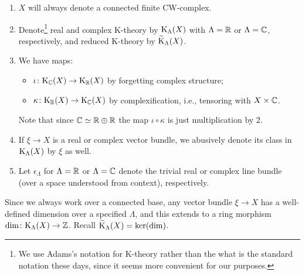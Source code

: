 \begin{notation}
  \begin{enumerate}[leftmargin=*]
  \item $X$ will always denote a connected finite CW-complex.
  \item Denote\footnote{We use Adams's notation for K-theory rather
      than the what is the standard notation these days, since it
      seems more convenient for our purposes.} real and complex
    K-theory by $\mathrm{K}_\Lambda(X)$ with $\Lambda = \mathbb{R}$ or $\Lambda = \mathbb{C}$,
    respectively, and reduced K-theory by $\widetilde{\mathrm{K}}_\Lambda(X)$.
  \item We have maps:
    \begin{itemize}
    \item $\iota \colon \mathrm{K}_{\mathbb{C}}(X) \to \mathrm{K}_{\mathbb{R}}(X)$ by forgetting complex
      structure;
    \item $\kappa \colon \mathrm{K}_{\mathbb{R}}(X) \to \mathrm{K}_{\mathbb{C}}(X)$ by complexification, i.e.,
      tensoring with $X \times \mathbb{C}$.
    \end{itemize}
    Note that since $\mathbb{C} \simeq \mathbb{R} \oplus \mathbb{R}$ the map $\iota \circ
    \kappa$ is just multiplication by $2$.
  \item If $\xi \to X$ is a real or complex vector bundle, we
    abusively denote its class in $\mathrm{K}_\Lambda(X)$ by $\xi$ as well.
  \item Let $\epsilon_\Lambda$ for $\Lambda = \mathbb{R}$ or $\Lambda = \mathbb{C}$
    denote the trivial real or complex line bundle (over a space
    understood from context), respectively.
  \end{enumerate}
\end{notation}

\begin{remark}
  \label{dimension-welldefined}
  Since we always work over a connected base, any vector bundle $\xi
  \to X$ has a well-defined dimension over a specified $\Lambda$, and
  this extends to a ring morphism $\dim \colon \mathrm{K}_\Lambda(X) \to \mathbb{Z}$. Recall
  $\widetilde{\mathrm{K}}_\Lambda(X) = \ker(\dim)$.
\end{remark}

